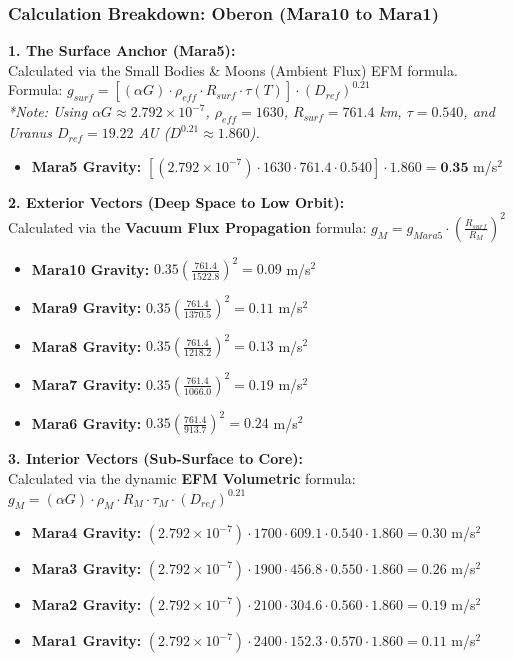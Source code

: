 \documentclass[11pt, a4paper]{article}
\begin{document}
\clearpage
\subsubsection{Calculation Breakdown: Oberon (Mara10 to Mara1)}

\noindent \textbf{1. The Surface Anchor (Mara5):} \\
Calculated via the Small Bodies \& Moons (Ambient Flux) EFM formula. \\
Formula: $g_{surf} = \left[ (\alpha G) \cdot \rho_{eff} \cdot R_{surf} \cdot \tau(T) \right] \cdot (D_{ref})^{0.21}$ \\
\textit{*Note: Using $\alpha G \approx 2.792 \times 10^{-7}$, $\rho_{eff} = 1630$, $R_{surf} = 761.4$ km, $\tau = 0.540$, and Uranus $D_{ref} = 19.22$ AU ($D^{0.21} \approx 1.860$).}
\begin{itemize}
  \item \textbf{Mara5 Gravity:} $\left[ (2.792 \times 10^{-7}) \cdot 1630 \cdot 761.4 \cdot 0.540 \right] \cdot 1.860 = \textbf{0.35}$ m/s$^2$
\end{itemize}

\vspace{0.5em}
\noindent \textbf{2. Exterior Vectors (Deep Space to Low Orbit):} \\
Calculated via the \textbf{Vacuum Flux Propagation} formula: $g_M = g_{Mara5} \cdot \left( \frac{R_{surf}}{R_M} \right)^2$
\begin{itemize}
  \item \textbf{Mara10 Gravity:} $0.35 \left( \frac{761.4}{1522.8} \right)^2 = 0.09$ m/s$^2$
  \item \textbf{Mara9 Gravity:} $0.35 \left( \frac{761.4}{1370.5} \right)^2 = 0.11$ m/s$^2$
  \item \textbf{Mara8 Gravity:} $0.35 \left( \frac{761.4}{1218.2} \right)^2 = 0.13$ m/s$^2$
  \item \textbf{Mara7 Gravity:} $0.35 \left( \frac{761.4}{1066.0} \right)^2 = 0.19$ m/s$^2$
  \item \textbf{Mara6 Gravity:} $0.35 \left( \frac{761.4}{913.7} \right)^2 = 0.24$ m/s$^2$
\end{itemize}

\vspace{0.5em}
\noindent \textbf{3. Interior Vectors (Sub-Surface to Core):} \\
Calculated via the dynamic \textbf{EFM Volumetric} formula: $g_M = (\alpha G) \cdot \rho_{M} \cdot R_M \cdot \tau_M \cdot (D_{ref})^{0.21}$
\begin{itemize}
  \item \textbf{Mara4 Gravity:} $(2.792 \times 10^{-7}) \cdot 1700 \cdot 609.1 \cdot 0.540 \cdot 1.860 = 0.30$ m/s$^2$
  \item \textbf{Mara3 Gravity:} $(2.792 \times 10^{-7}) \cdot 1900 \cdot 456.8 \cdot 0.550 \cdot 1.860 = 0.26$ m/s$^2$
  \item \textbf{Mara2 Gravity:} $(2.792 \times 10^{-7}) \cdot 2100 \cdot 304.6 \cdot 0.560 \cdot 1.860 = 0.19$ m/s$^2$
  \item \textbf{Mara1 Gravity:} $(2.792 \times 10^{-7}) \cdot 2400 \cdot 152.3 \cdot 0.570 \cdot 1.860 = 0.11$ m/s$^2$
\end{itemize}
\end{document}
